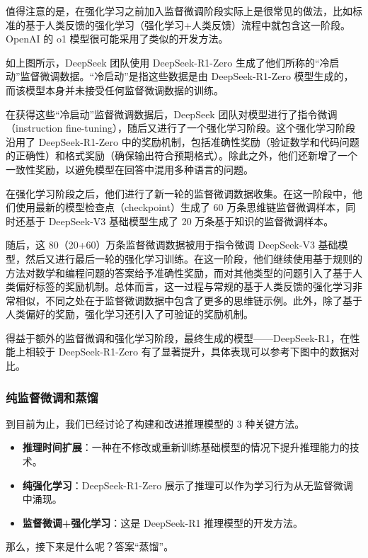 \documentclass[lang=cn,newtx,10pt,scheme=chinese]{elegantbook}
\begin{document}
值得注意的是，在强化学习之前加入监督微调阶段实际上是很常见的做法，比如标准的基于人类反馈的强化学习（强化学习+人类反馈）流程中就包含这一阶段。OpenAI 的 o1 模型很可能采用了类似的开发方法。

如上图所示，DeepSeek 团队使用 DeepSeek-R1-Zero 生成了他们所称的``冷启动''监督微调数据。``冷启动''是指这些数据是由 DeepSeek-R1-Zero 模型生成的，而该模型本身并未接受任何监督微调数据的训练。

在获得这些``冷启动''监督微调数据后，DeepSeek 团队对模型进行了指令微调（instruction fine-tuning），随后又进行了一个强化学习阶段。这个强化学习阶段沿用了 DeepSeek-R1-Zero 中的奖励机制，包括准确性奖励（验证数学和代码问题的正确性）和格式奖励（确保输出符合预期格式）。除此之外，他们还新增了一个一致性奖励，以避免模型在回答中混用多种语言的问题。

在强化学习阶段之后，他们进行了新一轮的监督微调数据收集。在这一阶段中，他们使用最新的模型检查点（checkpoint）生成了 60 万条思维链监督微调样本，同时还基于 DeepSeek-V3 基础模型生成了 20 万条基于知识的监督微调样本。

随后，这 80（20+60）万条监督微调数据被用于指令微调 DeepSeek-V3 基础模型，然后又进行最后一轮的强化学习训练。在这一阶段，他们继续使用基于规则的方法对数学和编程问题的答案给予准确性奖励，而对其他类型的问题引入了基于人类偏好标签的奖励机制。总体而言，这一过程与常规的基于人类反馈的强化学习非常相似，不同之处在于监督微调数据中包含了更多的思维链示例。此外，除了基于人类偏好的奖励，强化学习还引入了可验证的奖励机制。

得益于额外的监督微调和强化学习阶段，最终生成的模型——DeepSeek-R1，在性能上相较于 DeepSeek-R1-Zero 有了显著提升，具体表现可以参考下图中的数据对比。

\subsubsection{纯监督微调和蒸馏}

到目前为止，我们已经讨论了构建和改进推理模型的 3 种关键方法。

\begin{itemize}
\item \textbf{推理时间扩展}：一种在不修改或重新训练基础模型的情况下提升推理能力的技术。
\item \textbf{纯强化学习}：DeepSeek-R1-Zero 展示了推理可以作为学习行为从无监督微调中涌现。
\item \textbf{监督微调+强化学习}：这是 DeepSeek-R1 推理模型的开发方法。
\end{itemize}

那么，接下来是什么呢？答案``蒸馏''。
\end{document}
